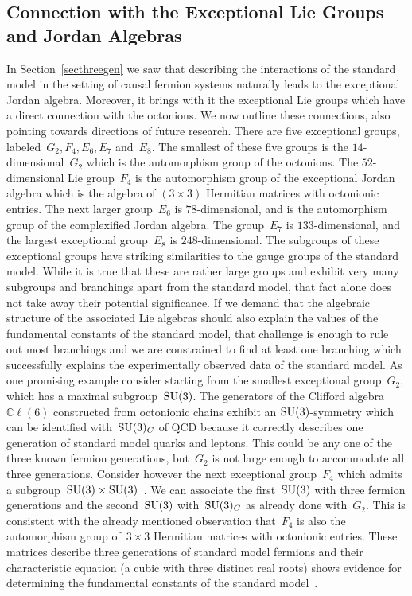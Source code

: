 \documentclass[reqno,11pt]{amsart}
\numberwithin{equation}{section}
\newcommand{\1}{\mbox{\rm 1 \hspace{-1.05 em} 1}}
\newcommand{\SU}{{\rm{SU}}}
\newcommand{\bb}[1]{\mathbb{#1}}
\begin{document}
\subsection{Connection with the Exceptional Lie Groups and Jordan Algebras} \label{sece68}
In Section~\ref{secthreegen} we saw that describing the interactions of the standard model
in the setting of causal fermion systems naturally leads to the exceptional Jordan algebra.
Moreover, it brings with it the exceptional Lie groups which have a direct connection with the octonions.
We now outline these connections, also pointing towards directions of future research.
There are five exceptional groups, labeled~$G_2, F_4, E_6, E_7$ and~$E_8$. The smallest of these five groups is the $14$-dimensional~$G_2$ which is the automorphism group of the octonions. The $52$-dimensional Lie group~$F_4$ is the automorphism group of the exceptional Jordan algebra which is the algebra of $(3\times 3)$ Hermitian matrices with octonionic entries. The next larger group~$E_6$ is $78$-dimensional, and is the automorphism group of the complexified Jordan algebra. The group~$E_7$ is $133$-dimensional, and the largest exceptional group~$E_8$ is $248$-dimensional. The subgroups of these exceptional groups have striking similarities to the gauge groups
of the standard model. While it is true that these are rather large groups and exhibit very many subgroups and branchings apart from the standard model, that fact alone does not take away their potential significance. If we demand that the algebraic structure of the associated Lie algebras should also explain the values of the fundamental constants of the standard model, that challenge is enough to rule out most branchings and we are constrained to find at least one branching which successfully explains the experimentally observed data of the standard model.
 As one promising example consider starting from the smallest exceptional group~$G_2$, which has a maximal subgroup~$\SU(3)$. The generators of the Clifford algebra~$\bb{C}\ell(6)$ constructed from octonionic chains exhibit an $\SU(3)$-symmetry which can be identified with~$\SU(3)_{C}$ of QCD because it correctly describes one generation of standard model quarks and leptons. This could be any one of the three known fermion generations, but~$G_2$ is not large enough to accommodate all three generations. Consider however the next exceptional group~$F_4$ which admits a subgroup~$\SU(3)\times \SU(3)$~\cite{Yokota}. We can associate the first~$\SU(3)$ with three fermion generations and the second~$\SU(3)$ with~$\SU(3)_{C}$ as already done with~$G_2$. This is consistent with the already mentioned observation that~$F_4$ is also the automorphism group of~$3\times 3$ Hermitian matrices with octonionic entries.  These matrices describe three generations of standard model fermions and their characteristic equation (a cubic with three distinct real roots) shows evidence for determining the fundamental constants of the standard model~\cite{singh-octo3}.
 
\end{document}
